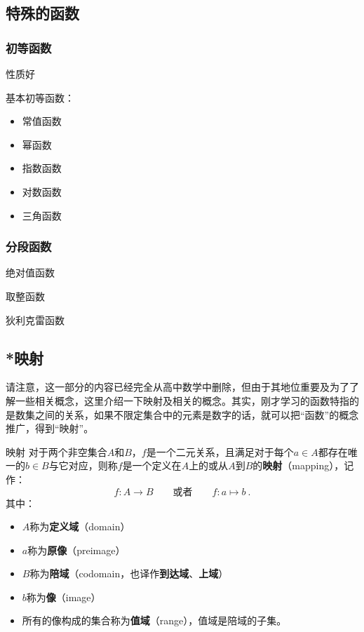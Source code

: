 \subsection{特殊的函数}

\subsubsection{初等函数}

性质好

基本初等函数：
\begin{itemize}
\item 常值函数
\item 幂函数
\item 指数函数
\item 对数函数
\item 三角函数
\end{itemize}

\subsubsection{分段函数}

绝对值函数

取整函数

狄利克雷函数

\subsection{*映射}

请注意，这一部分的内容已经完全从高中数学中删除，但由于其地位重要及为了了解一些相关概念，这里介绍一下映射及相关的概念。其实，刚才学习的函数特指的是数集之间的关系，如果不限定集合中的元素是数字的话，就可以把“函数”的概念推广，得到“映射”。

\begin{definition}{映射}
对于两个非空集合$A$和$B$，$f$是一个二元关系，且满足对于每个$a\in A$都存在唯一的$b\in B$与它对应，则称$f$是一个定义在$A$上的或从$A$到$B$的\textbf{映射}（mapping），记作：
\begin{equation}
f:A\to B\qquad\text{或者}\qquad f:a\mapsto b~.
\end{equation}
其中：
\begin{itemize}
\item $A$称为\textbf{定义域}（domain）
\item $a$称为\textbf{原像}（preimage）
\item $B$称为\textbf{陪域}（codomain，也译作\textbf{到达域}、\textbf{上域}）
\item $b$称为\textbf{像}（image）
\item 所有的像构成的集合称为\textbf{值域}（range），值域是陪域的子集。
\end{itemize}
\end{definition}

